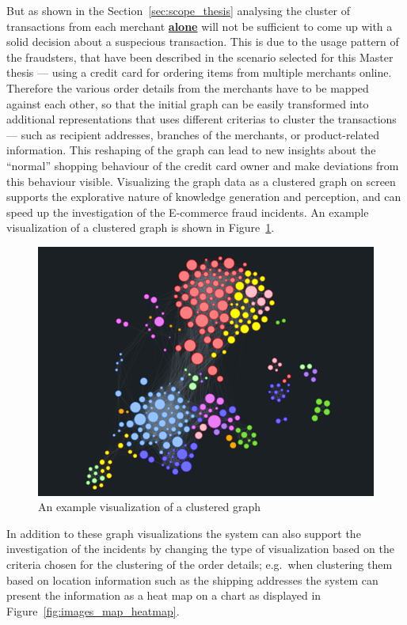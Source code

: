 But as shown in the Section~\ref{sec:scope_thesis} analysing the cluster of transactions from each merchant \textbf{\underline{alone}} will not be sufficient to come up with a solid decision about a suspecious transaction. This is due to the usage pattern of the fraudsters, that have been described in the scenario selected for this Master thesis --- using a credit card for ordering items from multiple merchants online. Therefore the various order details from the merchants have to be mapped against each other, so that the initial graph can be easily transformed into additional representations that uses different criterias to cluster the transactions --- such as recipient addresses, branches of the merchants, or product-related information. This reshaping of the graph can lead to new insights about the ``normal'' shopping behaviour of the credit card owner and make deviations from this behaviour visible. Visualizing the graph data as a clustered graph on screen supports the explorative nature of knowledge generation and perception, and can speed up the investigation of the E-commerce fraud incidents. An example visualization of a clustered graph is shown in Figure~\ref{fig:images_graph_viz}. \@

\begin{figure}[H]
  \centering
  \includegraphics[width=0.9\columnwidth]{images/GraphViz.png}
  \caption{An example visualization of a clustered graph \citep{visjsshowcase}}
\label{fig:images_graph_viz}
\end{figure}

 In addition to these graph visualizations the system can also support the investigation of the incidents by changing the type of visualization based on the criteria chosen for the clustering of the order details; e.g.\ when clustering them based on location information such as the shipping addresses the system can present the information as a heat map on a chart as displayed in Figure~\ref{fig:images_map_heatmap}. \@

